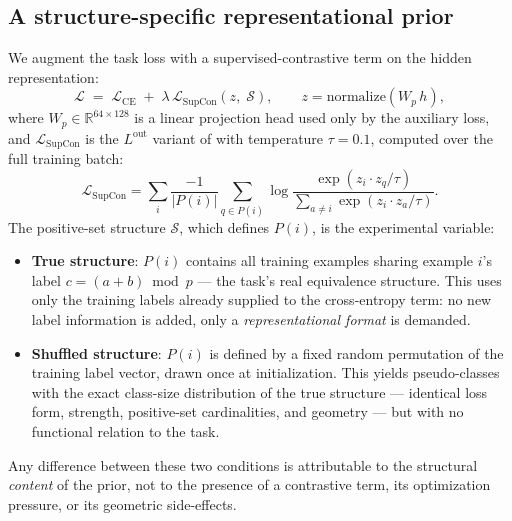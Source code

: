 \documentclass[11pt]{article}
\newcommand{\supcon}{\mathrm{SupCon}}
\begin{document}
\subsection{A structure-specific representational prior}
We augment the task loss with a supervised-contrastive term on the hidden representation:
\begin{equation}
\mathcal{L} \;=\; \mathcal{L}_{\mathrm{CE}} \;+\; \lambda\,
\mathcal{L}_{\supcon}\!\left(z,\; \mathcal{S}\right), \qquad z = \mathrm{normalize}(W_p\,h),
\end{equation}
where $W_p\in\mathbb{R}^{64\times128}$ is a linear projection head used only by the auxiliary
loss, and $\mathcal{L}_{\supcon}$ is the $L^{\mathrm{out}}$ variant of
\citet{khosla2020supervised} with temperature $\tau=0.1$, computed over the full training batch:
\begin{equation}
\mathcal{L}_{\supcon} = \sum_{i}\frac{-1}{|P(i)|}\sum_{q\in P(i)}
\log\frac{\exp(z_i\!\cdot\! z_q/\tau)}{\sum_{a\neq i}\exp(z_i\!\cdot\! z_a/\tau)}.
\end{equation}
The positive-set structure $\mathcal{S}$, which defines $P(i)$, is the experimental variable:
\begin{itemize}
\item \textbf{True structure}: $P(i)$ contains all training examples sharing example $i$'s label
      $c=(a+b)\bmod p$ --- the task's real equivalence structure. This uses only the training
      labels already supplied to the cross-entropy term: no new label information is added, only a
      \emph{representational format} is demanded.
\item \textbf{Shuffled structure}: $P(i)$ is defined by a fixed random permutation of the training
      label vector, drawn once at initialization. This yields pseudo-classes with the exact
      class-size distribution of the true structure --- identical loss form, strength, positive-set
      cardinalities, and geometry --- but with no functional relation to the task.
\end{itemize}
Any difference between these two conditions is attributable to the structural \emph{content} of
the prior, not to the presence of a contrastive term, its optimization pressure, or its geometric
side-effects.
\end{document}
